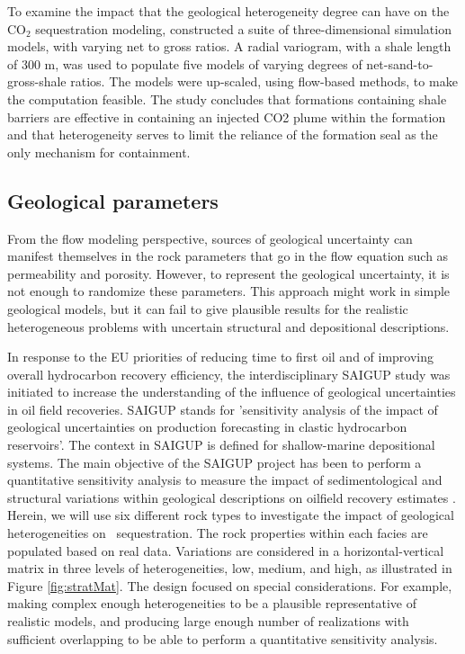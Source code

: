 To examine the impact that the geological heterogeneity degree can have on the $\mbox{CO}_2$ sequestration modeling, \cite{flett2007heterogeneous} constructed a suite of three-dimensional simulation models, with varying net to gross ratios. A radial variogram, with a shale length of 300 m, was used to
populate five models of varying degrees of net-sand-to-gross-shale ratios. The models were up-scaled, using flow-based methods, to make the computation feasible. The study concludes that formations containing shale barriers are effective in containing an injected CO2 plume within the formation and that heterogeneity serves to limit the reliance of the formation seal as the only mechanism for containment.

\subsection{Geological parameters}

From the flow modeling perspective, sources of geological uncertainty can
manifest themselves in the rock parameters that go in the flow equation such as permeability and porosity. However, to represent the geological uncertainty, it is not enough to randomize these parameters. This approach might work in simple geological models, but it can fail to give plausible results for the realistic heterogeneous problems with uncertain structural and depositional descriptions.

In response to the EU priorities of reducing time to first oil and of improving
overall hydrocarbon recovery efficiency, the interdisciplinary SAIGUP study was
initiated to increase the understanding of the influence of geological
uncertainties in oil field recoveries. SAIGUP stands for 'sensitivity analysis
of the impact of geological uncertainties on production forecasting in clastic
hydrocarbon reservoirs'. The context in SAIGUP is defined for shallow-marine
depositional systems. The main objective of the SAIGUP project has been to
perform a quantitative sensitivity analysis to measure the impact of
sedimentological and structural variations within geological descriptions on 
oilfield recovery estimates
\cite{howell2008sedimentological,manzocchi2008sensitivity,matthews2008assessing}. Herein, we will use six different rock types  to investigate the impact of geological heterogeneities on \coo\ sequestration.  The rock properties within each facies are populated based on real data. Variations are considered in a horizontal-vertical matrix in three levels of heterogeneities, low, medium, and high, as illustrated in Figure \ref{fig:stratMat}. The design focused on special considerations. For example, making complex enough heterogeneities to be a plausible representative of realistic models, and producing large enough number of realizations with sufficient overlapping to be able to perform a quantitative sensitivity analysis.


